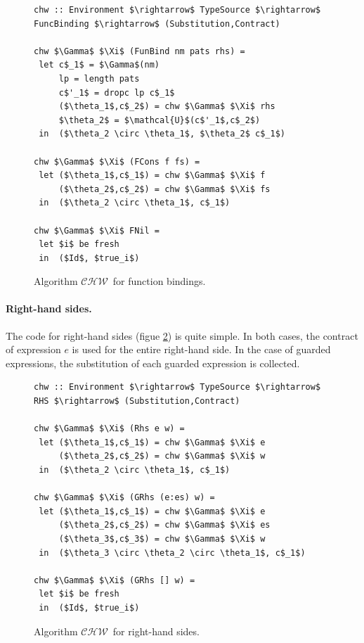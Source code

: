 \documentclass[10pt]{report}
\newcommand{\CHW}{$\mathcal{CHW}$}
\begin{document}
\begin{figure}[htbp]
\begin{lstlisting}[mathescape]
chw :: Environment $\rightarrow$ TypeSource $\rightarrow$ FuncBinding $\rightarrow$ (Substitution,Contract)

chw $\Gamma$ $\Xi$ (FunBind nm pats rhs) = 
 let c$_1$ = $\Gamma$(nm)
     lp = length pats
     c$'_1$ = dropc lp c$_1$
     ($\theta_1$,c$_2$) = chw $\Gamma$ $\Xi$ rhs
     $\theta_2$ = $\mathcal{U}$(c$'_1$,c$_2$)
 in  ($\theta_2 \circ \theta_1$, $\theta_2$ c$_1$)
 
chw $\Gamma$ $\Xi$ (FCons f fs) = 
 let ($\theta_1$,c$_1$) = chw $\Gamma$ $\Xi$ f
     ($\theta_2$,c$_2$) = chw $\Gamma$ $\Xi$ fs
 in  ($\theta_2 \circ \theta_1$, c$_1$)
 
chw $\Gamma$ $\Xi$ FNil = 
 let $i$ be fresh
 in  ($Id$, $true_i$)
\end{lstlisting}
\caption{\label{fig:funbinds-algorithm-chw}Algorithm \CHW ~for function bindings.}
\end{figure}

\paragraph{Right-hand sides.}

The code for right-hand sides (figue \ref{fig:rhs-algorithm-chw}) is quite simple.
In both cases, the contract of expression $e$ is used for the entire right-hand side.
In the case of guarded expressions, the substitution of each guarded expression is collected.

\begin{figure}[htbp]
\begin{lstlisting}[mathescape]
chw :: Environment $\rightarrow$ TypeSource $\rightarrow$ RHS $\rightarrow$ (Substitution,Contract)

chw $\Gamma$ $\Xi$ (Rhs e w) = 
 let ($\theta_1$,c$_1$) = chw $\Gamma$ $\Xi$ e
     ($\theta_2$,c$_2$) = chw $\Gamma$ $\Xi$ w
 in  ($\theta_2 \circ \theta_1$, c$_1$)

chw $\Gamma$ $\Xi$ (GRhs (e:es) w) = 
 let ($\theta_1$,c$_1$) = chw $\Gamma$ $\Xi$ e
     ($\theta_2$,c$_2$) = chw $\Gamma$ $\Xi$ es
     ($\theta_3$,c$_3$) = chw $\Gamma$ $\Xi$ w
 in  ($\theta_3 \circ \theta_2 \circ \theta_1$, c$_1$)
 
chw $\Gamma$ $\Xi$ (GRhs [] w) = 
 let $i$ be fresh
 in  ($Id$, $true_i$)
\end{lstlisting}
\caption{\label{fig:rhs-algorithm-chw}Algorithm \CHW ~for right-hand sides.}
\end{figure}
\end{document}
